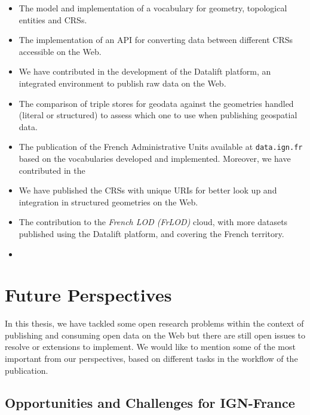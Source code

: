 \begin{itemize}
\item The model and implementation of a vocabulary for geometry, topological entities and CRSs.
\item The implementation of an API for converting data between different CRSs accessible on the Web.
\item We have contributed in the development of the Datalift platform, an integrated environment to publish raw data on the Web.
\item The comparison of triple stores for geodata against the geometries handled (literal or structured) to assess which one to use when publishing geospatial data. 
\item The publication of the French Administrative Units available at \texttt{data.ign.fr} based on the vocabularies developed and implemented. Moreover, we have contributed in the 
\item We have published the CRSs with unique URIs for better look up and integration in structured geometries on the Web.
\item The contribution to the \textit{French LOD (FrLOD)} cloud, with more datasets published using the Datalift platform, and covering the French territory.
\item 
\end{itemize}


\section{Future Perspectives}
\label{sec:future}

In this thesis, we have tackled some open research problems within the context of publishing and consuming open data on the Web but there are still open issues to resolve or extensions to implement. We would like to mention some of the most important from our perspectives, based on different tasks in the workflow of the publication. 

\subsection{Opportunities and Challenges for IGN-France}
\label{sec:challenges}

